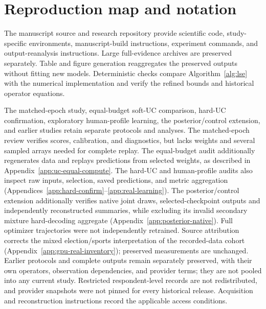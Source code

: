 \section{Reproduction map and notation}\label{app:reproduction}
The manuscript source and research repository provide scientific code, study-specific environments, manuscript-build instructions, experiment commands, and output-reanalysis instructions. Large full-evidence archives are preserved separately. Table and figure generation reaggregates the preserved outputs without fitting new models. Deterministic checks compare Algorithm~\ref{alg:lse} with the numerical implementation and verify the refined bounds and historical operator equations.

The matched-epoch study, equal-budget soft-UC comparison, hard-UC confirmation, exploratory human-profile learning, the posterior/control extension, and earlier studies retain separate protocols and analyses. The matched-epoch review verifies scores, calibration, and diagnostics, but lacks weights and several sampled arrays needed for complete replay. The equal-budget audit additionally regenerates data and replays predictions from selected weights, as described in Appendix~\ref{app:uc-equal-compute}. The hard-UC and human-profile audits also inspect raw inputs, selection, saved predictions, and metric aggregation (Appendices~\ref{app:hard-confirm}--\ref{app:real-learning}). The posterior/control extension additionally verifies native joint draws, selected-checkpoint outputs and independently reconstructed summaries, while excluding its invalid secondary mixture hard-decoding aggregate (Appendix~\ref{app:posterior-native}). Full optimizer trajectories were not independently retrained. Source attribution corrects the mixed election/sports interpretation of the recorded-data cohort (Appendix~\ref{app:gpu-real-inventory}); preserved measurements are unchanged. Earlier protocols and complete outputs remain separately preserved, with their own operators, observation dependencies, and provider terms; they are not pooled into any current study. Restricted respondent-level records are not redistributed, and provider snapshots were not pinned for every historical release. Acquisition and reconstruction instructions record the applicable access conditions.

